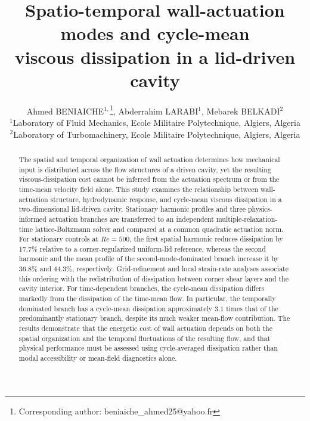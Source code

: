 \documentclass[11pt,a4paper]{article}
\title{\bfseries Spatio-temporal wall-actuation modes and cycle-mean\\
viscous dissipation in a lid-driven cavity}
\author{ Ahmed BENIAICHE$^{1,}$\thanks{Corresponding author: beniaiche\_ahmed25@yahoo.fr},  Abderrahim LARABI$^{1}$,  Mebarek BELKADI$^{2}$\\[4pt]
$^{1}$Laboratory of Fluid Mechanics, Ecole Militaire Polytechnique, Algiers, Algeria\\
$^{2}$Laboratory of Turbomachinery, Ecole Militaire Polytechnique, Algiers, Algeria}
\date{}
\newenvironment{chgdel}{\par\color{red}}{\par\color{black}}
\begin{document}
\maketitle

\begin{center}
\end{center}
\medskip


\begin{chgdel}
\begin{abstract}
The spatial and temporal organization of wall actuation determines how mechanical
input is distributed across the flow structures of a driven cavity, yet the
resulting viscous-dissipation cost cannot be inferred from the actuation spectrum
or from the time-mean velocity field alone. This study examines the relationship
between wall-actuation structure, hydrodynamic response, and cycle-mean viscous
dissipation in a two-dimensional lid-driven cavity. Stationary harmonic profiles
and three physics-informed actuation branches are transferred to an independent
multiple-relaxation-time lattice-Boltzmann solver and compared at a common
quadratic actuation norm. For stationary controls at $Re=500$, the first spatial
harmonic reduces dissipation by $17.7\%$ relative to a corner-regularized
uniform-lid reference, whereas the second harmonic and the mean profile of the
second-mode-dominated branch increase it by $36.8\%$ and $44.3\%$, respectively.
Grid-refinement and local strain-rate analyses associate this ordering with the
redistribution of dissipation between corner shear layers and the cavity interior.
For time-dependent branches, the cycle-mean dissipation differs markedly from the
dissipation of the time-mean flow. In particular, the temporally dominated branch
has a cycle-mean dissipation approximately $3.1$ times that of the predominantly
stationary branch, despite its much weaker mean-flow contribution. The results
demonstrate that the energetic cost of wall actuation depends on both the spatial
organization and the temporal fluctuations of the resulting flow, and that physical
performance must be assessed using cycle-averaged dissipation rather than modal
accessibility or mean-field diagnostics alone.
\end{abstract}
\end{chgdel}
\end{document}
